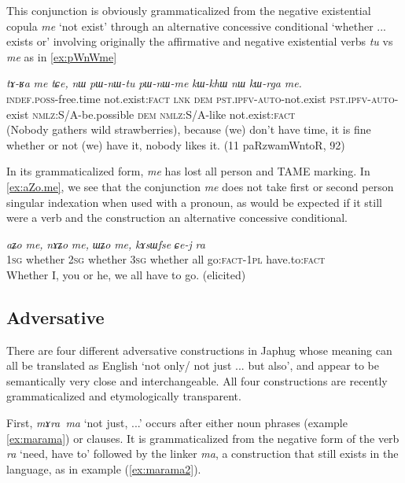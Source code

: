 \documentclass[oneside,a4paper,11pt]{article}
\newcommand{\ipa}[1]{\mbox{\phon\textit{#1}}} %
\begin{document}
This conjunction is obviously grammaticalized from the negative existential copula \ipa{me} `not exist' through an alternative  concessive conditional `whether ... exists or' involving originally the affirmative and negative existential verbs \ipa{tu} vs \ipa{me} as in \ref{ex:pWnWme}

\begin{exe}
\ex \label{ex:pWnWme}
\gll \ipa{tɤ-ʁa} 	\ipa{me} 	\ipa{tɕe,} 	\ipa{nɯ} 	\ipa{pɯ-nɯ-tu} 	\ipa{pɯ-nɯ-me} 	\ipa{kɯ-khɯ} 	\ipa{nɯ} 	\ipa{kɯ-rga} 	\ipa{me.} \\
\textsc{indef.poss}-free.time not.exist:\textsc{fact} \textsc{lnk} \textsc{dem} \textsc{pst.ipfv-auto}-not.exist \textsc{pst.ipfv-auto}-exist \textsc{nmlz}:S/A-be.possible \textsc{dem} \textsc{nmlz}:S/A-like not.exist:\textsc{fact} \\
\glt (Nobody gathers wild strawberries), because (we) don't have time, it is fine whether or not (we) have it, nobody likes it. (11 paRzwamWntoR, 92)
\end{exe}
 
 In its grammaticalized form, \ipa{me} has lost all person and TAME marking.  In \ref{ex:aZo.me}, we see that the conjunction \ipa{me} does not take first or second person singular indexation when used with a pronoun, as would be expected if it still were a verb and the construction an alternative  concessive conditional.
 
 \begin{exe}
\ex \label{ex:aZo.me}
\gll 
 \ipa{aʑo} 	\ipa{me,} 	\ipa{nɤʑo} 	\ipa{me,} 	\ipa{ɯʑo} 	\ipa{me,} 	\ipa{kɤsɯfse} 	\ipa{ɕe-j} 	\ipa{ra} \\
\textsc{1sg} whether \textsc{2sg} whether \textsc{3sg} whether all go:\textsc{fact}-\textsc{1pl} have.to:\textsc{fact} \\
\glt Whether I, you or he, we all have to go. (elicited)
\end{exe}


\subsection{Adversative}
There are four different  adversative constructions in Japhug whose meaning can all be translated as English  `not only/ not just ... but also', and appear to be semantically very close and interchangeable. All four constructions are recently grammaticalized and etymologically transparent.

First, \ipa{mɤra ma} `not just, ...'  occurs after either noun phrases (example  \ref{ex:marama}) or clauses. It is grammaticalized from the negative form of the verb \ipa{ra} `need, have to' followed by the linker \ipa{ma}, a construction that still exists in the language, as in example (\ref{ex:marama2}).
\end{document}
